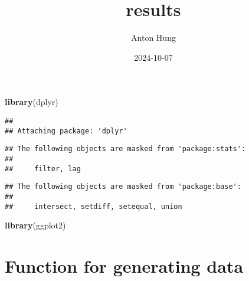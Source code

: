 \documentclass[
]{article}
\title{results}
\author{Anton Hung}
\date{2024-10-07}
\newenvironment{Shaded}{\begin{snugshade}}{\end{snugshade}}
\newcommand{\FunctionTok}[1]{\textcolor[rgb]{0.13,0.29,0.53}{\textbf{#1}}}
\newcommand{\NormalTok}[1]{#1}
\begin{document}
\maketitle

\begin{Shaded}
\begin{Highlighting}[]
\FunctionTok{library}\NormalTok{(dplyr)}
\end{Highlighting}
\end{Shaded}

\begin{verbatim}
## 
## Attaching package: 'dplyr'
\end{verbatim}

\begin{verbatim}
## The following objects are masked from 'package:stats':
## 
##     filter, lag
\end{verbatim}

\begin{verbatim}
## The following objects are masked from 'package:base':
## 
##     intersect, setdiff, setequal, union
\end{verbatim}

\begin{Shaded}
\begin{Highlighting}[]
\FunctionTok{library}\NormalTok{(ggplot2)}
\end{Highlighting}
\end{Shaded}

\section{Function for generating
data}\label{function-for-generating-data}
\end{document}
